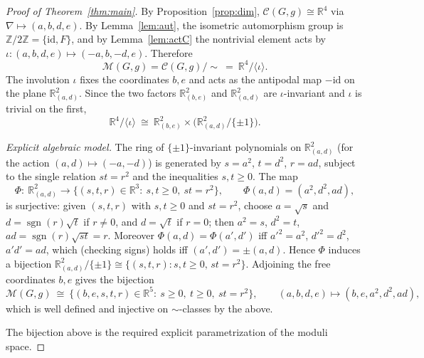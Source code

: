 \documentclass{amsart}
\theoremstyle{definition}
\theoremstyle{remark}
\begin{document}
\begin{proof}[Proof of Theorem~\ref{thm:main}]
By Proposition~\ref{prop:dim}, $\mathcal C(G,g)\cong\mathbb R^4$ via $\nabla\mapsto(a,b,d,e)$. By
Lemma~\ref{lem:aut}, the isometric automorphism group is $\mathbb Z/2\mathbb Z=\{\mathrm{id},F\}$, and by
Lemma~\ref{lem:actC} the nontrivial element acts by $\iota:(a,b,d,e)\mapsto(-a,b,-d,e)$. Therefore
\[
\mathcal M(G,g)=\mathcal C(G,g)/\!\sim\ =\ \mathbb R^4/\langle\iota\rangle.
\]
The involution $\iota$ fixes the coordinates $b,e$ and acts as the antipodal map $-\mathrm{id}$ on the plane
$\mathbb R^2_{(a,d)}$. Since the two factors $\mathbb R^2_{(b,e)}$ and $\mathbb R^2_{(a,d)}$ are
$\iota$-invariant and $\iota$ is trivial on the first,
\[
\mathbb R^4/\langle\iota\rangle\ \cong\ \mathbb R^2_{(b,e)}\times\bigl(\mathbb R^2_{(a,d)}/\{\pm 1\}\bigr).
\]

\emph{Explicit algebraic model.} The ring of $\{\pm1\}$-invariant polynomials on $\mathbb R^2_{(a,d)}$ (for the
action $(a,d)\mapsto(-a,-d)$) is generated by $s=a^2$, $t=d^2$, $r=ad$, subject to the single relation $st=r^2$
and the inequalities $s,t\ge0$. The map
\[
\Phi:\ \mathbb R^2_{(a,d)}\longrightarrow\bigl\{(s,t,r)\in\mathbb R^3:\ s,t\ge0,\ st=r^2\bigr\},\qquad
\Phi(a,d)=(a^2,d^2,ad),
\]
is surjective: given $(s,t,r)$ with $s,t\ge0$ and $st=r^2$, choose $a=\sqrt s$ and $d=\operatorname{sgn}(r)\sqrt t$
if $r\neq0$, and $d=\sqrt t$ if $r=0$; then $a^2=s$, $d^2=t$, $ad=\operatorname{sgn}(r)\sqrt{st}=r$. Moreover
$\Phi(a,d)=\Phi(a',d')$ iff $a'^2=a^2$, $d'^2=d^2$, $a'd'=ad$, which (checking signs) holds iff
$(a',d')=\pm(a,d)$. Hence $\Phi$ induces a bijection $\mathbb R^2_{(a,d)}/\{\pm1\}\cong\{(s,t,r):s,t\ge0,\,st=r^2\}$.
Adjoining the free coordinates $b,e$ gives the bijection
\[
\mathcal M(G,g)\ \cong\ \bigl\{(b,e,s,t,r)\in\mathbb R^5:\ s\ge0,\ t\ge0,\ st=r^2\bigr\},\qquad
(a,b,d,e)\mapsto(b,e,a^2,d^2,ad),
\]
which is well defined and injective on $\sim$-classes by the above.

The bijection above is the required explicit parametrization of the moduli space.


\end{proof}
\end{document}
